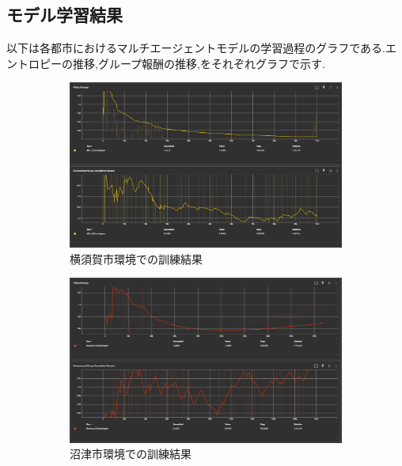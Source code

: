 \subsection{モデル学習結果}
以下は各都市におけるマルチエージェントモデルの学習過程のグラフである.エントロピーの推移,グループ報酬の推移,をそれぞれグラフで示す.
\begin{figure}[H]
  \centering
  \begin{subfigure}{0.45\textwidth}
      \centering
      \includegraphics[width=\textwidth]{Figures/YokosukaModel-Result.png}
      \caption{横須賀市環境での訓練結果}
      \label{fig:image1}
  \end{subfigure}
  \begin{subfigure}{0.45\textwidth}
      \centering
      \includegraphics[width=\textwidth]{Figures/NumazuModel-Result.png}
      \caption{沼津市環境での訓練結果}
      \label{fig:image2}
  \end{subfigure}
  \caption{}
  \label{fig:side_by_side}
\end{figure}
